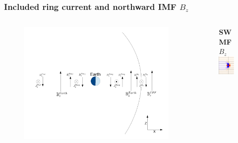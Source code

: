 \begin{frame}
	\frametitle{Included ring current and northward IMF $B_z$}
	\begin{columns}
	\begin{column}{.6\textwidth}
	\begin{figure}
		\includegraphics[scale=.23]{images/NimfRC.pdf}
		
	\end{figure}
	\end{column}
	\begin{column}{.4\textwidth}
	\begin{figure}
		\textbf{SWMF $B_z$}\\
		\includegraphics[scale=.45]{images/NBzRCM.png}
	\end{figure}
	\end{column}
	\end{columns}
\end{frame}

